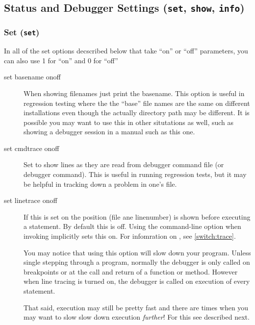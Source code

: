 \subsection{Status and Debugger Settings ({\tt set}, {\tt show}, {\tt info})}

\subsubsection{Set ({\tt set})\label{subsubsection:set}}

In all of the set options decscribed below that take ``on'' or ``off''
parameters, you can also use 1 for ``on'' and 0 for ``off''

\begin{description}

\item[set basename on\code{\Large{|}}off]

When showing filenames just print the basename. This option is useful
in regression testing where the the ``base'' file names are the same
on different installations even though the actually directory path may
be different. It is possible you may want to use this in other
situtations as well, such as showing a debugger session in a manual
such as this one. 

\item[set cmdtrace on\code{\Large{|}}off]\label{command:cmdtrace}
 
Set to show lines as they are read from debugger command file (or
 debugger command). This is useful in running
regression tests, but it may be helpful in tracking down a problem in
one's  file.

\item[set linetrace on\code{\Large{|}}off]\label{command:linetrace}

If this is set on the position (file ane linenumber) is shown before
executing a statement. By default this is off. Using the command-line
option  when invoking  implicitly sets this
on.  For infomration on , see \ref{switch:trace}.

You may notice that using this option will slow down your
program. Unless single stepping through a program, normally the
debugger is only called on breakpoints or at the call and return of a
function or method. However when line tracing is turned on, the
debugger is called on execution of every statement. 

That said, execution may still be pretty fast and there are times when
you may want to slow slow down execution \emph{further}\/! For this
see  described next.


\end{description}

